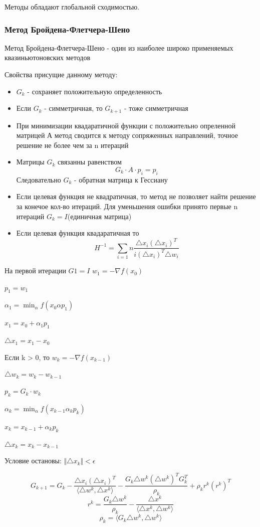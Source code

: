 \documentclass[a4paper, 14pt]{article}
\begin{document}
Методы обладают глобальной сходимостью.

\subsubsection*{Метод Бройдена-Флетчера-Шено}
Метод Бройдена-Флетчера-Шено - один из наиболее широко применяемых квазиньютоновских методов

Свойства присущие данному методу:

\begin{itemize}
	\item  $G_k$ - сохраняет положительную определенность
	\item Если $G_k$ - симметричная, то $G_{k+1}$ - тоже симметричная
	\item При минимизации квадаратичной функции с положительно опреленной матрицей А метод сводится к методу сопряженных направлений, точное решение не более чем за n итераций
	\item Матрицы $G_k$ связанны равенством
	\[
	G_k \cdot A \cdot p_i = p_i\]
	Следовательно $G_k$ - обратная матрица к Гессиану
	\item Если целевая функция не квадратичная, то метод не позволяет найти решение за конечое кол-во итераций. Для уменьшения ошибки принято первые n итераций $G_k = I$(единичная матрица)
	\item Если целевая функция  квадаратичная то
	\[
	H^{-1} = \sum_{i = 1} n\frac{\triangle x_i(\triangle x_i)^T}{i(\triangle x_i)^T \triangle w_i} \]
\end{itemize}

На первой итерации $G1 = I$
$w_1 =  - \nabla f(x_0)$

$p_1 = w_1$

$\alpha_1 = \min_\alpha f(x_0 \alpha p_1)$

$x_1 = x_0 + \alpha_1 p_1$

$\triangle x_1 = x_1 - x_0$

 Если k > 0, то
$w_k =  - \nabla f(x_{k - 1})$

$\triangle  w_k = w_k - w_{k-1}$

$p_k = G_k \cdot w_k$

$\alpha_k = \min_\alpha f(x_{k - 1} \alpha_k p_k)$

$x_k = x_{k-1} + \alpha_k p_k$

$\triangle x_k = x_k - x_{k - 1}$

Условие остановы: $\Vert \triangle x_k \Vert < \epsilon$

\[G_{k+1} = G_k - \frac{\triangle x_i(\triangle x_i)^T}{\langle \triangle w^k, \triangle x^k\rangle} - \frac{G_k \triangle w^k (\triangle w^k)^T G_k^T}{\rho_k} + \rho_k r^k (r^k)^T\]
\[
r^k = \frac{G_k \triangle w^k}{\rho_k} - \frac{\triangle x^k}{\langle \triangle x^k, \triangle w^k \rangle}\]
\[
\rho_k = \langle G_k \triangle w^k, \triangle w^k \rangle\]
\end{document}
